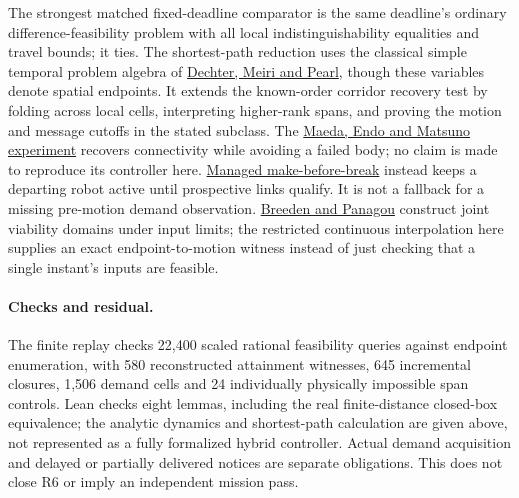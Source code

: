 \documentclass[11pt]{article}
\begin{document}
The strongest matched fixed-deadline comparator is the same
deadline's ordinary difference-feasibility problem with all
local indistinguishability equalities and travel bounds; it ties.
The shortest-path reduction uses the classical simple temporal
problem algebra of \href{https://www.sciencedirect.com/science/article/pii/0004370291900066}{Dechter, Meiri and Pearl},
though these variables denote spatial endpoints. It extends the
known-order corridor recovery test by folding across local cells,
interpreting higher-rank spans, and proving the motion and message
cutoffs in the stated subclass.
The \href{https://en.endo-lab.jp/research/detail/499}{Maeda, Endo
and Matsuno experiment} recovers connectivity while avoiding a
failed body; no claim is made to reproduce its controller here.
\href{https://arxiv.org/html/2609.29939v1\#S3.SS2.SSS3}{Managed
make-before-break} instead keeps a departing robot active until
prospective links qualify. It is not a fallback for a missing
pre-motion demand observation. \href{https://arxiv.org/abs/2210.01354}{Breeden and Panagou}
construct joint viability domains under input limits; the
restricted continuous interpolation here supplies an exact
endpoint-to-motion witness instead of just checking that a
single instant's inputs are feasible.

\paragraph{Checks and residual.}
The finite replay checks 22,400 scaled rational feasibility
queries against endpoint enumeration, with 580 reconstructed
attainment witnesses, 645 incremental closures, 1,506 demand
cells and 24 individually physically impossible span controls.
Lean checks eight lemmas, including the real finite-distance
closed-box equivalence; the analytic dynamics and shortest-path
calculation are given above, not represented as a fully formalized
hybrid controller. Actual demand acquisition and delayed or
partially delivered notices are separate obligations. This does
not close R6 or imply an independent mission pass.
\end{document}

